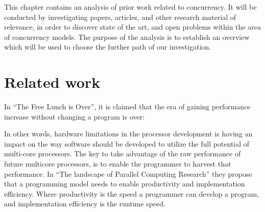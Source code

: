 \makeatletter {}\makeatother
{}
This chapter contains an analysis of prior work related to concurrency. It will be conducted by investigating papers, articles, and other research material of relevance, in order to discover state of the art, and open problems within the area of concurrency models. The purpose of the analysis is to establish an overview which will be used to choose the further path of our investigation.
\label{chap:preliminary_analysis}

\section{Related work}

In ``The Free Lunch is Over''\cite{sutter2005free}, it is claimed that the era of gaining performance increase without changing a program is over:


In other words, hardware limitations in the processor development is having an impact on the way software should be developed to utilize the full potential of multi-core processors. The key to take advantage of the raw performance of future multicore processors, is to enable the programmer to harvest that performance\cite[p. 31]{asanovic2006landscape}. In ``The landscape of Parallel Computing Research''\cite{asanovic2006landscape} they propose that a programming model needs to enable productivity and implementation efficiency\cite[p. 31]{asanovic2006landscape}. Where productivity is the speed a programmer can develop a program, and implementation efficiency is the runtime speed.

